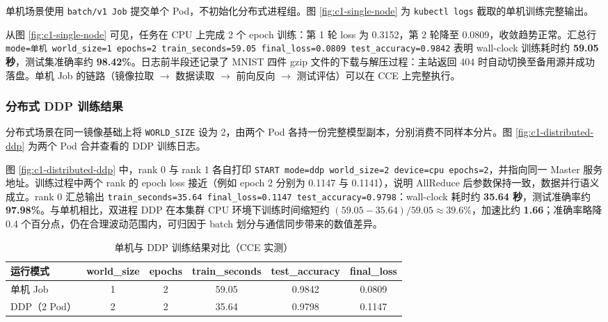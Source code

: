 单机场景使用 \verb|batch/v1 Job| 提交单个 Pod，不初始化分布式进程组。图 \ref{fig:c1-single-node} 为 \verb|kubectl logs| 截取的单机训练完整输出。


从图 \ref{fig:c1-single-node} 可见，任务在 CPU 上完成 2 个 epoch 训练：第 1 轮 loss 为 0.3152，第 2 轮降至 0.0809，收敛趋势正常。汇总行 \verb|mode=单机 world_size=1 epochs=2 train_seconds=59.05 final_loss=0.0809 test_accuracy=0.9842| 表明 wall-clock 训练耗时约 \textbf{59.05 秒}，测试集准确率约 \textbf{98.42\%}。日志前半段还记录了 MNIST 四件 gzip 文件的下载与解压过程：主站返回 404 时自动切换至备用源并成功落盘。单机 Job 的链路（镜像拉取 $\rightarrow$ 数据读取 $\rightarrow$ 前向反向 $\rightarrow$ 测试评估）可以在 CCE 上完整执行。

\subsubsection{分布式 DDP 训练结果}

分布式场景在同一镜像基础上将 \verb|WORLD_SIZE| 设为 2，由两个 Pod 各持一份完整模型副本，分别消费不同样本分片。图 \ref{fig:c1-distributed-ddp} 为两个 Pod 合并查看的 DDP 训练日志。


图 \ref{fig:c1-distributed-ddp} 中，rank 0 与 rank 1 各自打印 \verb|START mode=ddp world_size=2 device=cpu epochs=2|，并指向同一 Master 服务地址。训练过程中两个 rank 的 epoch loss 接近（例如 epoch 2 分别为 0.1147 与 0.1141），说明 AllReduce 后参数保持一致，数据并行语义成立。rank 0 汇总输出 \verb|train_seconds=35.64 final_loss=0.1147 test_accuracy=0.9798|：wall-clock 耗时约 \textbf{35.64 秒}，测试准确率约 \textbf{97.98\%}。与单机相比，双进程 DDP 在本集群 CPU 环境下训练时间缩短约 \((59.05-35.64)/59.05 \approx 39.6\%\)，加速比约 \textbf{1.66}；准确率略降 0.4 个百分点，仍在合理波动范围内，可归因于 batch 划分与通信同步带来的数值差异。

\begin{table}[H]
  \centering
  \caption{单机与 DDP 训练结果对比（CCE 实测）}
  \label{tab:c1-timing-compare}
  \small
  \renewcommand{\arraystretch}{1.25}
  \begin{tabularx}{\textwidth}{>{\centering\arraybackslash}p{2.0cm} C C C C C}
    \toprule
    运行模式 & world\_size & epochs & train\_seconds & test\_accuracy & final\_loss \\
    \midrule
    单机 Job & 1 & 2 & 59.05 & 0.9842 & 0.0809 \\
    DDP（2 Pod） & 2 & 2 & 35.64 & 0.9798 & 0.1147 \\
    \bottomrule
  \end{tabularx}
\end{table}

